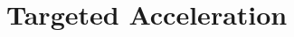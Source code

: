\documentclass[main.tex]{subfiles}
\begin{document}
\section{Targeted Acceleration}

\end{document}
